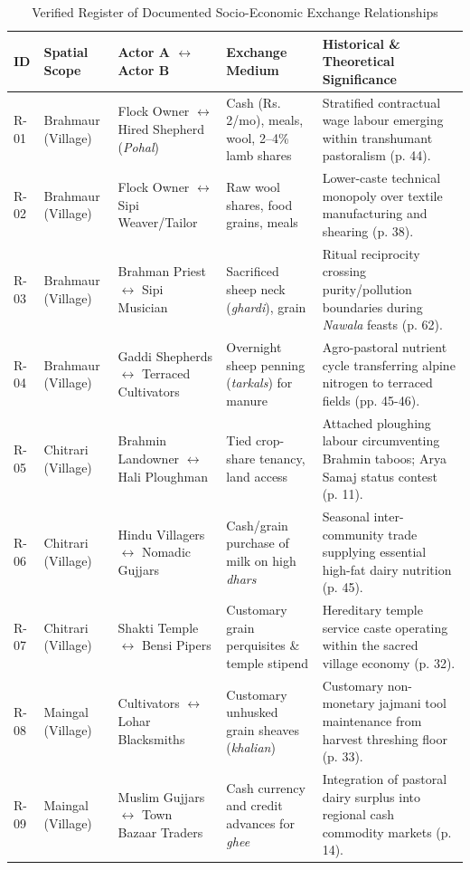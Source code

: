 \documentclass[11pt,a4paper]{article}
\begin{document}
\begin{table}[htbp]
\centering
\footnotesize
\caption{Verified Register of Documented Socio-Economic Exchange Relationships}
\label{tab:network}
\begin{tabularx}{\textwidth}{llp{2.8cm}p{3.2cm}X}
\toprule
\textbf{ID} & \textbf{Spatial Scope} & \textbf{Actor A $\leftrightarrow$ Actor B} & \textbf{Exchange Medium} & \textbf{Historical \& Theoretical Significance} \\
\midrule
R-01 & Brahmaur (Village) & Flock Owner $\leftrightarrow$ Hired Shepherd (\textit{Pohal}) & Cash (Rs. 2/mo), meals, wool, 2--4\% lamb shares & Stratified contractual wage labour emerging within transhumant pastoralism (p. 44). \\
R-02 & Brahmaur (Village) & Flock Owner $\leftrightarrow$ Sipi Weaver/Tailor & Raw wool shares, food grains, meals & Lower-caste technical monopoly over textile manufacturing and shearing (p. 38). \\
R-03 & Brahmaur (Village) & Brahman Priest $\leftrightarrow$ Sipi Musician & Sacrificed sheep neck (\textit{ghardi}), grain & Ritual reciprocity crossing purity/pollution boundaries during \textit{Nawala} feasts (p. 62). \\
R-04 & Brahmaur (Village) & Gaddi Shepherds $\leftrightarrow$ Terraced Cultivators & Overnight sheep penning (\textit{tarkals}) for manure & Agro-pastoral nutrient cycle transferring alpine nitrogen to terraced fields (pp. 45-46). \\
R-05 & Chitrari (Village) & Brahmin Landowner $\leftrightarrow$ Hali Ploughman & Tied crop-share tenancy, land access & Attached ploughing labour circumventing Brahmin taboos; Arya Samaj status contest (p. 11). \\
R-06 & Chitrari (Village) & Hindu Villagers $\leftrightarrow$ Nomadic Gujjars & Cash/grain purchase of milk on high \textit{dhars} & Seasonal inter-community trade supplying essential high-fat dairy nutrition (p. 45). \\
R-07 & Chitrari (Village) & Shakti Temple $\leftrightarrow$ Bensi Pipers & Customary grain perquisites \& temple stipend & Hereditary temple service caste operating within the sacred village economy (p. 32). \\
R-08 & Maingal (Village) & Cultivators $\leftrightarrow$ Lohar Blacksmiths & Customary unhusked grain sheaves (\textit{khalian}) & Customary non-monetary jajmani tool maintenance from harvest threshing floor (p. 33). \\
R-09 & Maingal (Village) & Muslim Gujjars $\leftrightarrow$ Town Bazaar Traders & Cash currency and credit advances for \textit{ghee} & Integration of pastoral dairy surplus into regional cash commodity markets (p. 14). \\

\end{tabularx}
\end{table}
\end{document}
